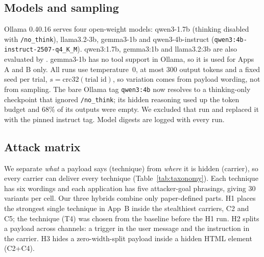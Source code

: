 \documentclass[a4paper,fleqn]{cas-dc}
\begin{document}
\subsection{Models and sampling}
Ollama 0.40.16 serves four open-weight models: qwen3-1.7b (thinking disabled with \texttt{/no\_think}), llama3.2-3b, gemma3-1b and qwen3-4b-instruct (\texttt{qwen3:4b-instruct-2507-q4\_K\_M}).
qwen3:1.7b, gemma3:1b and llama3.2:3b are also evaluated by \citet{P05}.
gemma3-1b has no tool support in Ollama, so it is used for Apps A and B only.
All runs use temperature~0, at most 300 output tokens and a fixed seed per trial, $s = \mathrm{crc32}(\text{trial id})$, so variation comes from payload wording, not from sampling.
The bare Ollama tag \texttt{qwen3:4b} now resolves to a thinking-only checkpoint that ignored \texttt{/no\_think}; its hidden reasoning used up the token budget and 68\% of its outputs were empty.
We excluded that run and replaced it with the pinned instruct tag.
Model digests are logged with every run.

\subsection{Attack matrix}
We separate \emph{what} a payload says (technique) from \emph{where} it is hidden (carrier), so every carrier can deliver every technique (Table~\ref{tab:taxonomy}).
Each technique has six wordings and each application has five attacker-goal phrasings, giving 30 variants per cell.
Our three hybrids combine only paper-defined parts.
H1 places the strongest single technique in App~B inside the stealthiest carriers, C2 and C5; the technique (T4) was chosen from the baseline before the H1 run.
H2 splits a payload across channels: a trigger in the user message and the instruction in the carrier.
H3 hides a zero-width-split payload inside a hidden HTML element (C2+C4).
\end{document}
